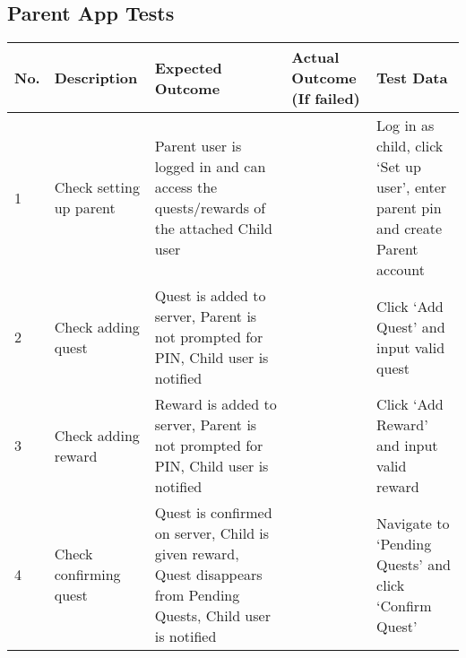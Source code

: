 \begin{landscape}
\section{Parent App Tests}
\begin{tabularx}{\linewidth}{p{1cm} X X X X}
\textbf{No.} & \textbf{Description}                    & \textbf{Expected Outcome}                                  	& \textbf{Actual Outcome (If failed)} & \textbf{Test Data}                                          \\ \hline
1            & Check setting up parent & Parent user is logged in and can access the quests/rewards of the attached Child user                             &                                     & Log in as child, click `Set up user', enter parent pin and create Parent account \\ \hline
2            & Check adding quest      & Quest is added to server, Parent is not prompted for PIN, Child user is notified                                  &                                     & Click `Add Quest' and input valid quest                                          \\ \hline
3            & Check adding reward     & Reward is added to server, Parent is not prompted for PIN, Child user is notified                                 &                                     & Click `Add Reward' and input valid reward                                        \\ \hline
4            & Check confirming quest  & Quest is confirmed on server, Child is given reward, Quest disappears from Pending Quests, Child user is notified &                                     & Navigate to `Pending Quests' and click `Confirm Quest'                           \\ \hline
\end{tabularx} 

\end{landscape}